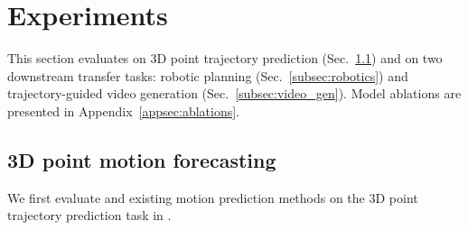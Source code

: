 
\section{Experiments}
\label{sec:experiments}

This section evaluates \modelname on 3D point trajectory prediction (Sec.~\ref{subsec:motion_prediction}) and on two downstream transfer tasks: robotic planning (Sec.~\ref{subsec:robotics}) and trajectory-guided video generation (Sec.~\ref{subsec:video_gen}). Model ablations are presented in Appendix~\ref{appsec:ablations}.



\subsection{3D point motion forecasting}
\label{subsec:motion_prediction}
We first evaluate \modelname and existing motion prediction methods on the 3D point trajectory prediction task in \benchmarkname{}. 


